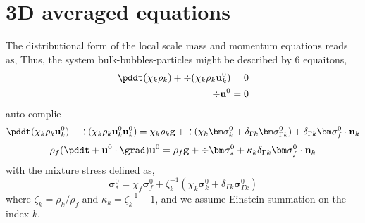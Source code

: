 \section{3D averaged equations}
\label{sec:averaged equations}
The distributional form of the local scale mass and momentum equations reads as, 
Thus, the system bulk-bubbles-particles might be described by 6 equaitons, 
\begin{align}
    \pddt (\chi_k \rho_k)
    + \div (\chi_k \rho_k \textbf{u}_k^0)
    &= 
    0\\
    \div \textbf{u}^0
    &= 
    0
\end{align}
auto complie
\begin{equation}
    \pddt (\chi_k \rho_k \textbf{u}^0_k)
    + \div (
        \chi_k \rho_k \textbf{u}^0_k \textbf{u}_k^0
        )
    = 
    \chi_k \rho_k \textbf{g}
    + \div (\chi_k \bm\sigma_k^0  + \delta_{\Gamma k} \bm\sigma_{\Gamma k}^0 )
    + \delta_{\Gamma k}  \bm\sigma_f^0 \cdot \textbf{n}_k
\end{equation}
\begin{equation}
    \rho_f (\pddt + \textbf{u}^0 \cdot \grad)\textbf{u}^0
    = 
    \rho_f \textbf{g}
    + \div \bm\sigma^0_*
    +\kappa_k  \delta_{\Gamma k}  \bm\sigma_f^0 \cdot \textbf{n}_k 
\end{equation}
with the mixture stress defined as, 
\begin{equation}
    \bm\sigma^0_*
    =
    \chi_f \bm\sigma_f^0  
    +\zeta_k^{-1} (\chi_k \bm\sigma_k^0 + \delta_{\Gamma k} \bm\sigma_{\Gamma k}^0)  
\end{equation}
where $\zeta_k = \rho_k/\rho_f$ and  $ \kappa_k  = \zeta^{-1}_k - 1 $, and we assume Einstein summation on the index $k$.


